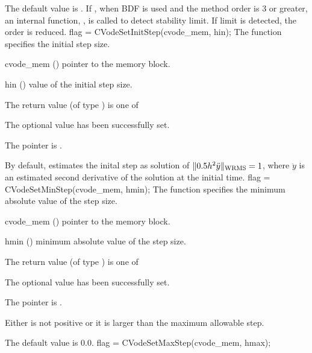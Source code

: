 {
  The default value is . If , when BDF is used
  and the method order is 3 or greater, an internal function, ,
  is called to detect stability limit. If limit is detected, the order is reduced.
}
{
flag = CVodeSetInitStep(cvode\_mem, hin);
}
{
  The function  specifies the initial step size.
}
{
  \begin{args}
  \item[cvode\_mem] ()
    pointer to the {\cvode} memory block.
  \item[hin] ()
    value of the initial step size.
  \end{args}
}
{
  The return value  (of type ) is one of
  \begin{args}
  \item[\Id{SUCCESS}] 
    The optional value has been successfully set.
  \item[\Id{CVS\_NO\_MEM}]
    The  pointer is .
  \end{args}
}
{
  By default, {\cvode} estimates the inital step as solution of 
  $\| 0.5 h^2 \ddot y \|_{\mbox{\scriptsize WRMS}} = 1$,
  where $\ddot y$ is an estimated second derivative of the solution at the
  initial time.
}
{
flag = CVodeSetMinStep(cvode\_mem, hmin);
}
{
  The function  specifies the minimum absolute
  value of the step size.
}
{
  \begin{args}
  \item[cvode\_mem] ()
    pointer to the {\cvode} memory block.
  \item[hmin] ()
    minimum absolute value of the step size.
  \end{args}
}
{
  The return value  (of type ) is one of
  \begin{args}
  \item[\Id{SUCCESS}] 
    The optional value has been successfully set.
  \item[\Id{CVS\_NO\_MEM}]
    The  pointer is .
  \item[\Id{CVS\_ILL\_INPUT}]
    Either  is not positive or it is larger than the maximum allowable step.
  \end{args}
}
{
  The default value is $0.0$.
}
{
flag = CVodeSetMaxStep(cvode\_mem, hmax);
}
